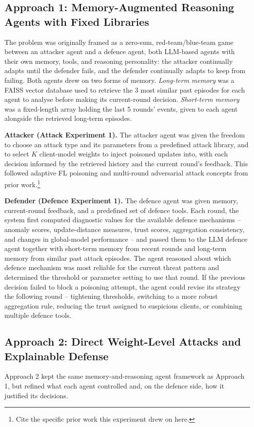 \subsection{Approach 1: Memory-Augmented Reasoning Agents with Fixed Libraries}
\label{sec:method-approach1}
The problem was originally framed as a zero-sum, red-team/blue-team game between an attacker agent and a defence agent, both LLM-based agents with their own memory, tools, and reasoning personality: the attacker continually adapts until the defender fails, and the defender continually adapts to keep from failing. Both agents drew on two forms of memory. \emph{Long-term memory} was a FAISS vector database used to retrieve the 3 most similar past episodes for each agent to analyse before making its current-round decision. \emph{Short-term memory} was a fixed-length array holding the last 5 rounds' events, given to each agent alongside the retrieved long-term episodes.

\textbf{Attacker (Attack Experiment 1).} The attacker agent was given the freedom to choose an attack type and its parameters from a predefined attack library, and to select $K$ client-model weights to inject poisoned updates into, with each decision informed by the retrieved history and the current round's feedback. This followed adaptive FL poisoning and multi-round adversarial attack concepts from prior work.\footnote{Cite the specific prior work this experiment drew on here.}

\textbf{Defender (Defence Experiment 1).} The defence agent was given memory, current-round feedback, and a predefined set of defence tools. Each round, the system first computed diagnostic values for the available defence mechanisms -- anomaly scores, update-distance measures, trust scores, aggregation consistency, and changes in global-model performance -- and passed them to the LLM defence agent together with short-term memory from recent rounds and long-term memory from similar past attack episodes. The agent reasoned about which defence mechanism was most reliable for the current threat pattern and determined the threshold or parameter setting to use that round. If the previous decision failed to block a poisoning attempt, the agent could revise its strategy the following round -- tightening thresholds, switching to a more robust aggregation rule, reducing the trust assigned to suspicious clients, or combining multiple defence tools.

\subsection{Approach 2: Direct Weight-Level Attacks and Explainable Defense}
\label{sec:method-approach2}
Approach 2 kept the same memory-and-reasoning agent framework as Approach 1, but refined what each agent controlled and, on the defence side, how it justified its decisions.

